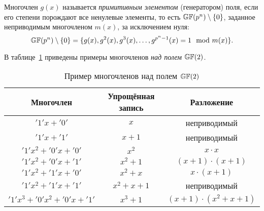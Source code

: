 Многочлен $g(x)$ называется \emph{примитивным элементом} (генератором) поля, если его степени порождают все ненулевые элементы, то есть $\mathbb{GF}(p^n) \setminus \{0\}$, заданное неприводимым многочленом $m(x)$, за исключением нуля:
    \[ \mathbb{GF}(p^n) \setminus \{0\} = \{ g(x), g^2(x), g^3(x), \dots, g^{p^n-1}(x) = 1 \mod m(x) \}. \]

\example
В таблице~\ref{tab:irreducible-gf2} приведены примеры многочленов \emph{над полем} $\mathbb{GF}(2)$.
\begin{table}[!ht]
    \centering
    \caption{Пример многочленов над полем $\mathbb{GF}(2)$\label{tab:irreducible-gf2}}
    \begin{tabular}{|c|c|c|}
        \hline
        Многочлен & \parbox[c][1cm][c]{2.5cm}{\centering Упрощённая запись} & Разложение \\
        \hline
        \rule{0pt}{2.5ex}$'1' x + '0'$ & $x$ & неприводимый \\
        $'1' x + '1'$ & $x+1$ & неприводимый \\
        $'1' x^2 + '0' x + '0'$ & $x^2$ & $x \cdot x$ \\
        $'1' x^2 + '0'x + '1'$ & $x^2 + 1$ & $(x+1) \cdot (x+1)$ \\
        $'1' x^2 + '1' x + '0'$ & $x^2 + x$ & $x \cdot (x+1)$ \\
        $'1' x^2 + '1' x + '1'$ & $x^2 + x + 1$ & неприводимый \\
        $'1' x^3 + '0' x^2 + '0' x + '1'$ & $x^3 + 1$ & $(x+1) \cdot (x^2+x+1)$ \\
        \hline
    \end{tabular}
\end{table}
\exampleend
